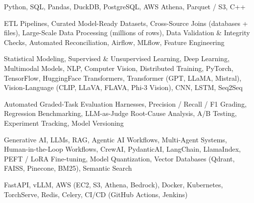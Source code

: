 \documentclass[letter,10pt]{article}
\begin{document}
 Python, SQL, Pandas, DuckDB, PostgreSQL, AWS Athena, Parquet / S3, C++\par\vspace{2pt}

 ETL Pipelines, Curated Model-Ready Datasets, Cross-Source Joins (databases + files), Large-Scale Data Processing (millions of rows), Data Validation \& Integrity Checks, Automated Reconciliation, Airflow, MLflow, Feature Engineering\par\vspace{2pt}

 Statistical Modeling, Supervised \& Unsupervised Learning, Deep Learning, Multimodal Models, NLP, Computer Vision, Distributed Training, PyTorch, TensorFlow, HuggingFace Transformers, Transformer (GPT, LLaMA, Mistral), Vision-Language (CLIP, LLaVA, FLAVA, Phi-3 Vision), CNN, LSTM, Seq2Seq\par\vspace{2pt}

 Automated Graded-Task Evaluation Harnesses, Precision / Recall / F1 Grading, Regression Benchmarking, LLM-as-Judge Root-Cause Analysis, A/B Testing, Experiment Tracking, Model Versioning\par\vspace{2pt}

 Generative AI, LLMs, RAG, Agentic AI Workflows, Multi-Agent Systems, Human-in-the-Loop Workflows, CrewAI, PydanticAI, LangChain, LlamaIndex, PEFT / LoRA Fine-tuning, Model Quantization, Vector Databases (Qdrant, FAISS, Pinecone, BM25), Semantic Search\par\vspace{2pt}

 FastAPI, vLLM, AWS (EC2, S3, Athena, Bedrock), Docker, Kubernetes, TorchServe, Redis, Celery, CI/CD (GitHub Actions, Jenkins)
\end{document}
